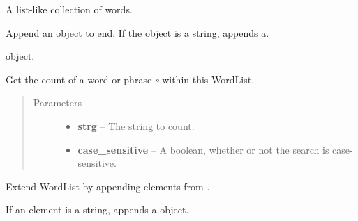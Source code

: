 \documentclass[letterpaper,10pt,english]{sphinxmanual}
\begin{document}
\begin{fulllineitems}
\label{api_reference:textblob_de.blob.WordList}
A list-like collection of words.

\begin{fulllineitems}
\label{api_reference:textblob_de.blob.WordList.append}
Append an object to end. If the object is a string, appends a.

{\hyperref[api_reference:textblob_de.blob.Word]{}} object.

\end{fulllineitems}


\begin{fulllineitems}
\label{api_reference:textblob_de.blob.WordList.count}
Get the count of a word or phrase \emph{s} within this WordList.
\begin{quote}\begin{description}
\item[{Parameters}] \leavevmode\begin{itemize}
\item {} 
\textbf{strg} -- The string to count.

\item {} 
\textbf{case\_sensitive} -- A boolean, whether or not the search is case-sensitive.

\end{itemize}

\end{description}\end{quote}

\end{fulllineitems}


\begin{fulllineitems}
\label{api_reference:textblob_de.blob.WordList.extend}
Extend WordList by appending elements from .

If an element
is a string, appends a {\hyperref[api_reference:textblob_de.blob.Word]{}} object.


\end{fulllineitems}
\end{fulllineitems}
\end{document}
